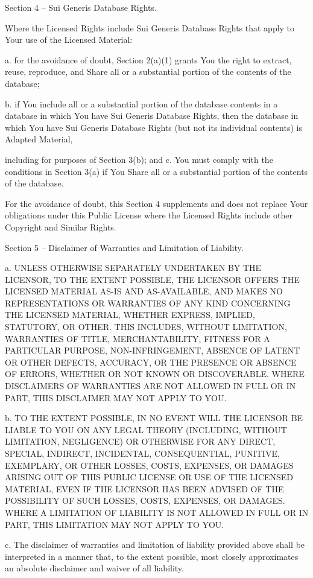 Section 4 -- Sui Generis Database Rights.

Where the Licensed Rights include Sui Generis Database Rights that apply to Your use of the Licensed Material\+:

a. for the avoidance of doubt, Section 2(a)(1) grants You the right to extract, reuse, reproduce, and Share all or a substantial portion of the contents of the database;

b. if You include all or a substantial portion of the database contents in a database in which You have Sui Generis Database Rights, then the database in which You have Sui Generis Database Rights (but not its individual contents) is Adapted Material,

including for purposes of Section 3(b); and c. You must comply with the conditions in Section 3(a) if You Share all or a substantial portion of the contents of the database.

For the avoidance of doubt, this Section 4 supplements and does not replace Your obligations under this Public License where the Licensed Rights include other Copyright and Similar Rights.

Section 5 -- Disclaimer of Warranties and Limitation of Liability.

a. UNLESS OTHERWISE SEPARATELY UNDERTAKEN BY THE LICENSOR, TO THE EXTENT POSSIBLE, THE LICENSOR OFFERS THE LICENSED MATERIAL AS-\/\+IS AND AS-\/\+AVAILABLE, AND MAKES NO REPRESENTATIONS OR WARRANTIES OF ANY KIND CONCERNING THE LICENSED MATERIAL, WHETHER EXPRESS, IMPLIED, STATUTORY, OR OTHER. THIS INCLUDES, WITHOUT LIMITATION, WARRANTIES OF TITLE, MERCHANTABILITY, FITNESS FOR A PARTICULAR PURPOSE, NON-\/\+INFRINGEMENT, ABSENCE OF LATENT OR OTHER DEFECTS, ACCURACY, OR THE PRESENCE OR ABSENCE OF ERRORS, WHETHER OR NOT KNOWN OR DISCOVERABLE. WHERE DISCLAIMERS OF WARRANTIES ARE NOT ALLOWED IN FULL OR IN PART, THIS DISCLAIMER MAY NOT APPLY TO YOU.

b. TO THE EXTENT POSSIBLE, IN NO EVENT WILL THE LICENSOR BE LIABLE TO YOU ON ANY LEGAL THEORY (INCLUDING, WITHOUT LIMITATION, NEGLIGENCE) OR OTHERWISE FOR ANY DIRECT, SPECIAL, INDIRECT, INCIDENTAL, CONSEQUENTIAL, PUNITIVE, EXEMPLARY, OR OTHER LOSSES, COSTS, EXPENSES, OR DAMAGES ARISING OUT OF THIS PUBLIC LICENSE OR USE OF THE LICENSED MATERIAL, EVEN IF THE LICENSOR HAS BEEN ADVISED OF THE POSSIBILITY OF SUCH LOSSES, COSTS, EXPENSES, OR DAMAGES. WHERE A LIMITATION OF LIABILITY IS NOT ALLOWED IN FULL OR IN PART, THIS LIMITATION MAY NOT APPLY TO YOU.

c. The disclaimer of warranties and limitation of liability provided above shall be interpreted in a manner that, to the extent possible, most closely approximates an absolute disclaimer and waiver of all liability.

